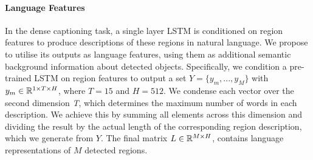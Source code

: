 \documentclass[11pt,a4paper]{article}
\newcommand{\kibitz}[2]{\ifnum\Comments=1\textcolor{#1}{#2}\fi}
\newcommand{\nikolai}[1]{\kibitz{red}  {[Nikolai: #1]}}
\newcommand{\R}{\mathbb{R}}
\begin{document}
\paragraph{Language Features}
In the dense captioning task, a single layer LSTM is conditioned on region features to produce descriptions of these regions in natural language.
We propose to utilise its outputs as language features, using them as additional semantic background information about detected objects.
Specifically, we condition a pre-trained LSTM on region features to output a set ${Y = \{y_m, ..., y_M\}}$ with $y_m \in \R\sp{1 \times T \times H}$, where $T=15$ and $H=512$.
We condense each vector over the second dimension \textit{T}, which determines the maximum number of words in each description. %
We achieve this by summing all elements across this dimension and dividing the result by the actual length of the corresponding region description, which we generate from $Y$.
The final matrix $L \in \R\sp{M \times H}$, contains language representations of $M$ detected regions.

\end{document}
